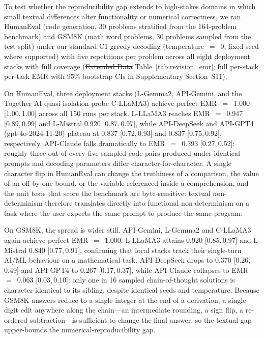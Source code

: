 \documentclass[sn-nature]{sn-jnl}
\makeatletter
\providecommand{\DIFdel}[1]{{\protect\color{red}\sout{#1}}} %
\providecommand{\DIFdelbegin}{} %
\providecommand{\DIFdelend}{} %
\providecommand{\DIFscaledelfig}{0.5}
\newlength{\DIFdelgraphicswidth} %
\newlength{\DIFdelgraphicsheight} %
\providecommand{\DIFdelincludegraphics}[2][]{%
\sbox{\DIFdelgraphicsbox}{\DIFOincludegraphics[#1]{#2}}%
\settoboxwidth{\DIFdelgraphicswidth}{\DIFdelgraphicsbox} %
\settoboxtotalheight{\DIFdelgraphicsheight}{\DIFdelgraphicsbox} %
\scalebox{\DIFscaledelfig}{%
\parbox[b]{\DIFdelgraphicswidth}{\usebox{\DIFdelgraphicsbox}\\[-\baselineskip] \rule{\DIFdelgraphicswidth}{0em}}\llap{\resizebox{\DIFdelgraphicswidth}{\DIFdelgraphicsheight}{%
\setlength{\unitlength}{\DIFdelgraphicswidth}%
\begin{picture}(1,1)%
\thicklines\linethickness{2pt} %
{\color[rgb]{1,0,0}\put(0,0){\framebox(1,1){}}}%
{\color[rgb]{1,0,0}\put(0,0){\line( 1,1){1}}}%
{\color[rgb]{1,0,0}\put(0,1){\line(1,-1){1}}}%
\end{picture}%
}\hspace*{3pt}}} %
} %
\DeclareRobustCommand{\DIFdelbegin}{\DIFOdelbegin \let\includegraphics\DIFdelincludegraphics} %
\DeclareRobustCommand{\DIFdelend}{\DIFOaddend \let\includegraphics\DIFOincludegraphics} %
\let\sout@orig\sout %
\renewcommand{\sout}[1]{\ifmmode\text{\sout@orig{\ensuremath{#1}}}\else\sout@orig{#1}\fi} %
\makeatother
\begin{document}
To test whether the reproducibility gap extends to high-stakes domains in which small textual differences alter functionality or numerical correctness, we ran HumanEval (code generation, 30 problems stratified from the 164-problem benchmark\cite{chen2021humaneval}) and GSM8K (math word problems, 30 problems sampled from the test split\cite{cobbe2021gsm8k}) under our standard C1 greedy decoding (temperature~$=$~0, fixed seed where supported) with five repetitions per problem across all eight deployment stacks with full coverage (\DIFdelbegin \DIFdel{Extended Data }\DIFdelend Table~\ref{tab:revision_emr}; full per-stack per-task EMR with 95\% bootstrap CIs in Supplementary Section~S11).

On HumanEval, three deployment stacks (L-Gemma2, API-Gemini, and the Together AI quasi-isolation probe C-LLaMA3) achieve perfect EMR~$=$~1.000 [1.00,\,1.00] across all 150 runs per stack.
L-LLaMA3 reaches EMR~$=$~0.947 [0.89,\,0.99] and L-Mistral 0.920 [0.87,\,0.97], while API-DeepSeek and API-GPT4 (gpt-4o-2024-11-20) plateau at 0.837 [0.72,\,0.93] and 0.837 [0.75,\,0.92], respectively.
API-Claude falls dramatically to EMR~$=$~0.393 [0.27,\,0.52]: roughly three out of every five sampled code pairs produced under identical prompts and decoding parameters differ character-for-character.
A single character flip in HumanEval can change the truthiness of a comparison, the value of an off-by-one bound, or the variable referenced inside a comprehension, and the unit tests that score the benchmark are byte-sensitive: textual non-determinism therefore translates directly into functional non-determinism on a task where the user expects the same prompt to produce the same program.

On GSM8K, the spread is wider still.
API-Gemini, L-Gemma2 and C-LLaMA3 again achieve perfect EMR~$=$~1.000.
L-LLaMA3 attains 0.920 [0.85,\,0.97] and L-Mistral 0.840 [0.77,\,0.91], confirming that local stacks track their single-turn AI/ML behaviour on a mathematical task.
API-DeepSeek drops to 0.370 [0.26,\,0.49] and API-GPT4 to 0.267 [0.17,\,0.37], while API-Claude collapses to EMR~$=$~0.063 [0.03,\,0.10]: only one in 16 sampled chain-of-thought solutions is character-identical to its sibling, despite identical seeds and temperature.
Because GSM8K answers reduce to a single integer at the end of a derivation, a single-digit edit anywhere along the chain---an intermediate rounding, a sign flip, a re-ordered subtraction---is sufficient to change the final answer, so the textual gap upper-bounds the numerical-reproducibility gap.
\end{document}
